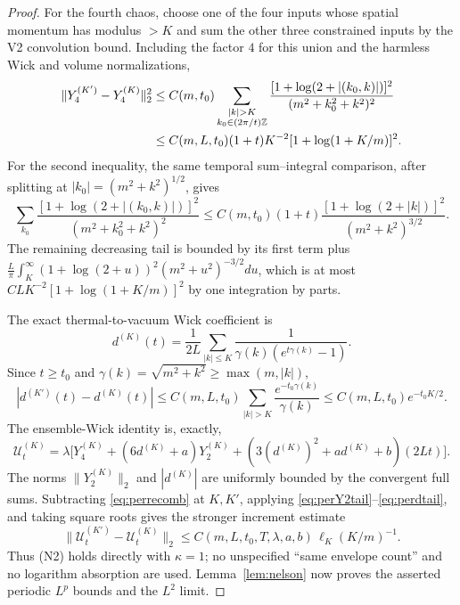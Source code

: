 \documentclass[11pt,a4paper]{article}
\theoremstyle{plain}
\theoremstyle{definition}
\newcommand{\Z}{\mathbb{Z}}
\newcommand{\U}{\mathcal U}
\begin{document}
\begin{proof}
For the fourth chaos, choose one of the four inputs whose spatial momentum has
modulus $>K$ and sum the other three constrained inputs by the V2 convolution
bound.  Including the factor $4$ for this union and the harmless Wick and volume
normalizations,
\begin{align}
 \|Y_4^{(K')}-Y_4^{(K)}\|_2^2
 &\le C(m,t_0)
 \sum_{\substack{|k|>K\\k_0\in(2\pi/t)\Z}}
 \frac{[1+\log(2+|(k_0,k)|)]^2}
      {(m^2+k_0^2+k^2)^2} \notag\\
 &\le C(m,L,t_0)(1+t)K^{-2}[1+\log(1+K/m)]^2 .                   \label{eq:perY4tail}
\end{align}
For the second inequality, the same temporal sum--integral comparison, after
splitting at $|k_0|=(m^2+k^2)^{1/2}$, gives
\[
 \sum_{k_0}\frac{[1+\log(2+|(k_0,k)|)]^2}
 {(m^2+k_0^2+k^2)^2}
 \le C(m,t_0)(1+t)
 \frac{[1+\log(2+|k|)]^2}{(m^2+k^2)^{3/2}}.
\]
The remaining decreasing tail is bounded by its first term plus
$\frac L\pi\int_K^\infty(1+\log(2+u))^2(m^2+u^2)^{-3/2}du$,
which is at most $CLK^{-2}[1+\log(1+K/m)]^2$ by one integration by parts.

The exact thermal-to-vacuum Wick coefficient is
\[
 d^{(K)}(t)=\frac1{2L}\sum_{|k|\le K}
 \frac1{\gamma(k)(e^{t\gamma(k)}-1)}.
\]
Since $t\ge t_0$ and $\gamma(k)=\sqrt{m^2+k^2}\ge\max(m,|k|)$,
\begin{equation}
 |d^{(K')}(t)-d^{(K)}(t)|
 \le C(m,L,t_0)\sum_{|k|>K}\frac{e^{-t_0\gamma(k)}}{\gamma(k)}
 \le C(m,L,t_0)e^{-t_0K/2}.                                      \label{eq:perdtail}
\end{equation}
The ensemble-Wick identity is, exactly,
\begin{equation}
 \U_t^{(K)}=\lambda\bigl[Y_4^{(K)}+(6d^{(K)}+a)Y_2^{(K)}
 +(3(d^{(K)})^2+ad^{(K)}+b)(2Lt)\bigr].                           \label{eq:perrecomb}
\end{equation}
The norms $\|Y_2^{(K)}\|_2$ and $|d^{(K)}|$ are uniformly bounded by the
convergent full sums.  Subtracting \eqref{eq:perrecomb} at $K,K'$, applying
\eqref{eq:perY2tail}--\eqref{eq:perdtail}, and taking square roots gives the
stronger increment estimate
\begin{equation}
 \|\U_t^{(K')}-\U_t^{(K)}\|_2
 \le C(m,L,t_0,T,\lambda,a,b)\,
       \ell_K(K/m)^{-1}.                                          \label{eq:perUtail}
\end{equation}
Thus (N2) holds directly with $\kappa=1$; no unspecified ``same envelope
count'' and no logarithm absorption are used.  Lemma~\ref{lem:nelson} now proves
the asserted periodic $L^p$ bounds and the $L^2$ limit.
\end{proof}
\end{document}
